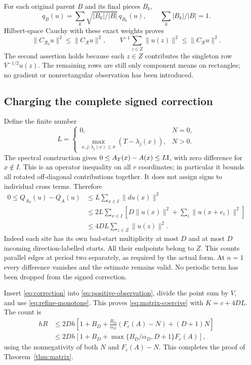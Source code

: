For each original parent $B$ and its final pieces $B_k$,
\[
 q_B(u)=\sum_k\sqrt{|B_k|/|B|}\,q_{B_k}(u),\qquad
 \sum_k|B_k|/|B|=1.
\]
Hilbert-space Cauchy with these exact weights proves
\begin{equation}\label{eq:refine-monotone}
 \|C_{\mathcal R_0}u\|^2\le\|C_{\mathcal R}u\|^2,
 \qquad V^{-1}\sum_{z\in Z}\|u(z)\|^2
                      \le\|C_{\mathcal R}u\|^2.
\end{equation}
The second assertion holds because each $z\in Z$ contributes the singleton
row $V^{-1/2}u(z)$. The remaining rows are still only component means on
rectangles; no gradient or nonrectangular observation has been introduced.

\subsection{Charging the complete signed correction}
Define the finite number
\begin{equation}\label{eq:negative-depth}
 L=\begin{cases}
 0,&N=0,\\
 \displaystyle\max_{x,j:\lambda_j(x)\le\sigma}(T-\lambda_j(x)),&N>0.
 \end{cases}
\end{equation}
The spectral construction gives
$0\le A_T(x)-A(x)\le L\mathrm I$, with zero difference for $x\notin I$.
This is an operator inequality on all $r$ coordinates; in particular it
bounds all rotated off-diagonal contributions together. It does not assign
signs to individual cross terms. Therefore
\begin{align}\label{eq:correction}
 0\le Q_{A_T}(u)-Q_A(u)
 &\le L\sum_{x\in I}\|du(x)\|^2\nonumber\\
 &\le2L\sum_{x\in I}
      \left[D\|u(x)\|^2+\sum_i\|u(x+e_i)\|^2\right]\\
 &\le4DL\sum_{z\in Z}\|u(z)\|^2.\nonumber
\end{align}
Indeed each site has its own bad-start multiplicity at most $D$ and at most
$D$ incoming direction-labelled starts. All their endpoints belong to $Z$.
This counts parallel edges at period two separately, as required by the
actual form. At $n=1$ every difference vanishes and the estimate remains
valid. No periodic term has been dropped from the signed correction.

Insert \eqref{eq:correction} into \eqref{eq:positive-observation}, divide
the point sum by $V$, and use \eqref{eq:refine-monotone}. This proves
\eqref{eq:matrix-coercive} with $K=c+4DL$. The count is
\begin{align*}
 hR&\le2Dh\left[1+B_D+\frac{B_D}{\alpha_D}(F_c(A)-N)
                                      +(D+1)N\right]\\
 &\le2Dh\left[1+B_D+
                 \max\{B_D/\alpha_D,D+1\}F_c(A)\right],
\end{align*}
using the nonnegativity of both $N$ and $F_c(A)-N$. This completes the proof
of Theorem~\ref{thm:matrix}.

